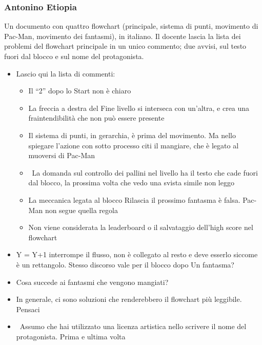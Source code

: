 \subsubsection{Antonino Etiopia}
Un documento con quattro flowchart (principale, sistema di punti, movimento di
Pac-Man, movimento dei fantasmi), in italiano. Il docente lascia la lista dei
problemi del flowchart principale in un unico commento; due avvisi, sul testo
fuori dal blocco e sul nome del protagonista.
{\small
\begin{itemize}
  \item {} Lascio qui la lista di commenti:
        \begin{itemize}
          \item Il ``2'' dopo lo Start non è chiaro
          \item La freccia a destra del Fine livello si interseca con un'altra, e crea una fraintendibilità che non può essere presente
          \item Il sistema di punti, in gerarchia, è prima del movimento. Ma nello spiegare l'azione con sotto processo citi il mangiare, che è legato al muoversi di Pac-Man
          \item \rvAvviso\ La domanda sul controllo dei pallini nel livello ha il testo che cade fuori dal blocco, la prossima volta che vedo una svista simile non leggo
          \item La meccanica legata al blocco Rilascia il prossimo fantasma è falsa. Pac-Man non segue quella regola
          \item Non viene considerata la leaderboard o il salvataggio dell'high score nel flowchart
        \end{itemize}
  \item {} Y = Y+1 interrompe il flusso, non è collegato al resto e deve esserlo siccome è un rettangolo. Stesso discorso vale per il blocco dopo Un fantasma?
  \item {} Cosa succede ai fantasmi che vengono mangiati?
  \item {} In generale, ci sono soluzioni che renderebbero il flowchart più leggibile. Pensaci
  \item {} \rvAvviso\ Assumo che hai utilizzato una licenza artistica nello scrivere il nome del protagonista. Prima e ultima volta
\end{itemize}
}

